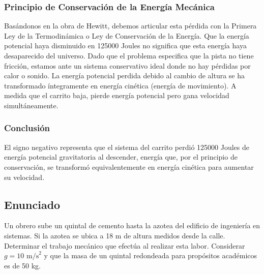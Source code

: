 \documentclass[12pt,a4paper]{article}
\begin{document}
\subsubsection*{Principio de Conservación de la Energía Mecánica}
Basándonos en la obra de Hewitt, debemos articular esta pérdida con la Primera Ley de la Termodinámica o Ley de Conservación de la Energía. Que la energía potencial haya disminuido en 125000 Joules no significa que esta energía haya desaparecido del universo. Dado que el problema especifica que la pista no tiene fricción, estamos ante un sistema conservativo ideal donde no hay pérdidas por calor o sonido. La energía potencial perdida debido al cambio de altura se ha transformado íntegramente en energía cinética (energía de movimiento). A medida que el carrito baja, pierde energía potencial pero gana velocidad simultáneamente. 

\subsubsection*{Conclusión}
El signo negativo representa que el sistema del carrito perdió 125000 Joules de energía potencial gravitatoria al descender, energía que, por el principio de conservación, se transformó equivalentemente en energía cinética para aumentar su velocidad.

\newpage
\subsection*{Enunciado}
Un obrero sube un quintal de cemento hasta la azotea del edificio de ingeniería en sistemas. Si la azotea se ubica a 18 m de altura medidos desde la calle. Determinar el trabajo mecánico que efectúa al realizar esta labor. Considerar $g = 10 \text{ m/s}^2$ y que la masa de un quintal redondeada para propósitos académicos es de 50 kg.

\begin{center}
\end{center}
\end{document}
